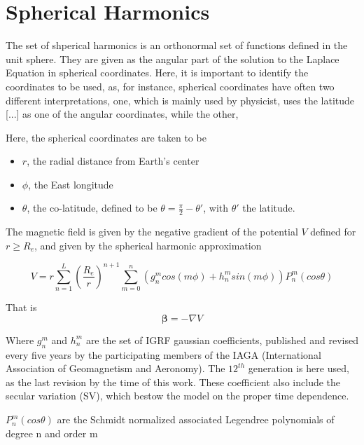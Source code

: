 
\section{Spherical Harmonics}

The set of shperical harmonics is an orthonormal set of functions defined in the unit sphere. They are given as the angular part of the solution to the Laplace Equation in spherical coordinates. Here, it is important to identify the coordinates to be used, as, for instance, spherical coordinates have often two different interpretations, one, which is mainly used by physicist, uses the latitude [...] as one of the angular coordinates, while the other, 

Here, the spherical coordinates are taken to be
\begin{itemize} 
\item[] $r$, the radial distance from Earth's center
\item[] $\phi$, the East longitude %
\item[] $\theta$, the co-latitude, defined to be $\theta = \frac{\pi}{2} - \theta'$, with $\theta'$ the latitude. %
\end{itemize}


The magnetic field is given by the negative gradient of the potential $V$ defined for $r \geq R_e$, and given by the spherical harmonic approximation

\begin{equation} \label{eq:igrf_potential}
V = r \sum_{n=1}^{L} \left(\dfrac{R_e}{r}\right)^{n+1} \sum_{m=0}^{n} \left(g_n^m cos(m\phi) + h_n^m sin(m\phi)\right) P_n^m(cos\theta)
\end{equation}

That is
\begin{equation}
{\bm \beta} = -\nabla V
\end{equation}


Where $g_n^m$ and $h_n^m$ are the set of IGRF gaussian coefficients, published and revised every five years by the participating members of the IAGA (International Association
of Geomagnetism and Aeronomy). The $12^{th}$ generation is here used, as the last revision by the time of this work. These coefficient also include the secular variation (SV), which bestow the model on the proper time dependence.

$P_n^m(cos \theta)$ are the Schmidt normalized associated Legendree polynomials of degree n and order m

